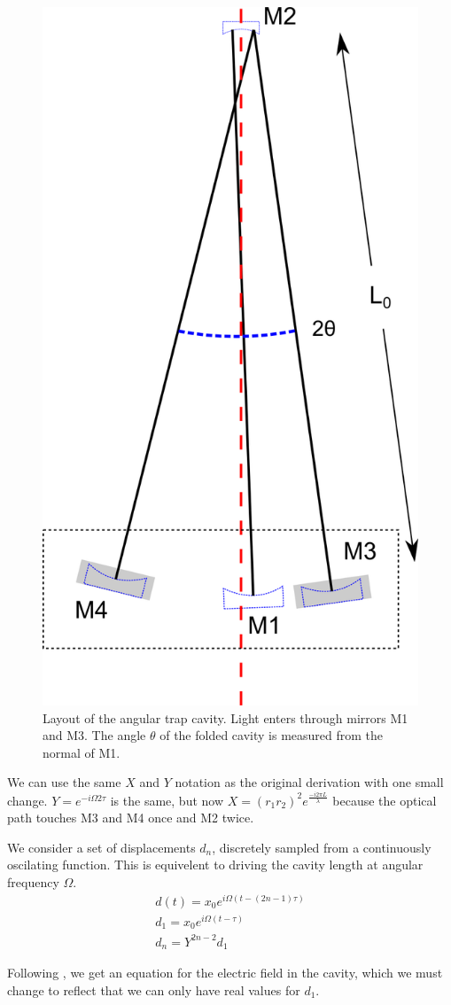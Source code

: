 \begin{figure}[p]
\vspace{5pt}
\begin{center}
\includegraphics[width=.5\textwidth]{figures/Angular/angularLayout}
\end{center}
\caption[Folded cavity layout]{%
\label{f:angularLayout}
Layout of the angular trap cavity. Light enters through mirrors M1 and M3. The angle $\theta$ of the folded cavity is measured from the normal of M1. 
}
\end{figure}

We can use the same $X$ and $Y$ notation as the original derivation with one small change. $Y=e^{-i\Omega 2\tau}$ is the same, but now $X=(r_1r_2)^2 e^{\frac{-i2\pi L}{\lambda}}$ because the optical path touches M3 and M4 once and M2 twice.

We consider a set of displacements $d_n$, discretely sampled from a continuously oscilating function. This is equivelent to driving the cavity length at angular frequency $\Omega$.  
\begin{eqnarray}
d(t) = x_0e^{i \Omega(t-(2n-1)\tau)}\\
d_1 = x_0e^{i \Omega(t-\tau)}\\
d_n = Y^{2n-2}d_1  
\end{eqnarray}

Following \cite{Perreca14}, we get an equation for the electric field in the cavity, which we must change to reflect that we can only have real values for $d_1$.

